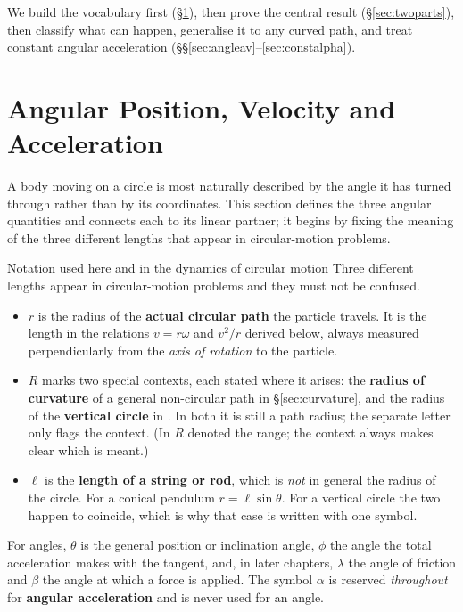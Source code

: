 We build the vocabulary first (\S\ref{sec:angular}), then prove the central result
(\S\ref{sec:twoparts}), then classify what can happen, generalise it to any curved path, and treat
constant angular acceleration (\S\S\ref{sec:angleav}--\ref{sec:constalpha}).

\section{Angular Position, Velocity and Acceleration}\label{sec:angular}
A body moving on a circle is most naturally described by the angle it has turned through rather than by its
coordinates. This section defines the three angular quantities and connects each to its linear partner; it
begins by fixing the meaning of the three different lengths that appear in circular-motion problems.

\begin{remarkbox}{Notation used here and in the dynamics of circular motion}
Three different lengths appear in circular-motion problems and they must not be confused.
\begin{itemize}
\item $r$ is the radius of the \textbf{actual circular path} the particle travels. It is the length in
      the relations $v=r\omega$ and $v^{2}/r$ derived below, always measured perpendicularly from the \emph{axis of rotation}
      to the particle.
\item $R$ marks two special contexts, each stated where it arises: the \textbf{radius of curvature} of
      a general non-circular path in \S\ref{sec:curvature}, and the radius of the \textbf{vertical circle} in
      . In both it is still a path radius; the separate letter only flags the context.
      (In  $R$ denoted the range; the context always makes clear which is meant.)
\item $\ell$ is the \textbf{length of a string or rod}, which is \emph{not} in general the radius of the
      circle. For a conical pendulum $r=\ell\sin\theta$. For a vertical circle the two happen to coincide,
      which is why that case is written with one symbol.
\end{itemize}
For angles, $\theta$ is the general position or inclination angle, $\phi$ the angle the total
acceleration makes with the tangent, and, in later chapters, $\lambda$ the angle of friction and
$\beta$ the angle at which a force is applied. The symbol $\alpha$ is reserved \emph{throughout} for \textbf{angular acceleration}
and is never used for an angle.
\end{remarkbox}

